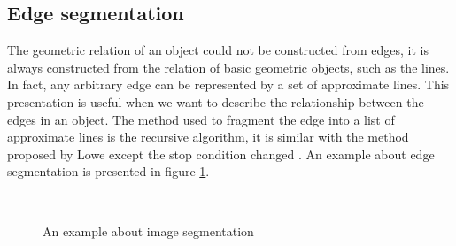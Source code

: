 \subsection{Edge segmentation}
The geometric relation of an object could not be constructed from edges, it is always constructed from the relation of basic geometric objects, such as the lines.  In fact, any arbitrary edge can be represented by a set of approximate lines. This presentation is useful when we want to describe the relationship between the edges in an object. The method used to fragment the edge into a list of approximate lines is the recursive algorithm\cite{thacker1995assessing}, it is similar with the method proposed by Lowe\cite{lowe1987three} except the stop condition changed
. An example about edge segmentation is presented in figure \ref{fig:figure_22}.
\begin{figure}[h!]
\centering
{}~~
\caption{An example about image segmentation}
\label{fig:figure_22}
\end{figure}
